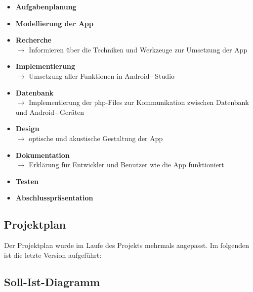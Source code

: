 \documentclass[12pt, a4paper]{article}
\begin{document}
\begin{itemize}

\item \textbf{Aufgabenplanung}   

\item \textbf{Modellierung der App} 

\item \textbf{Recherche} \\
$\rightarrow$ Informieren über die Techniken und Werkzeuge zur Umsetzung der App

\item \textbf{Implementierung} \\
$\rightarrow$ Umsetzung aller Funktionen in Android$-$Studio

\item \textbf{Datenbank} \\
$\rightarrow$ Implementierung der php-Files zur Kommunikation zwischen Datenbank und Android$-$Geräten

\item \textbf{Design} \\
$\rightarrow$ optische und akustische Gestaltung der App

\item \textbf{Dokumentation} \\
$\rightarrow$ Erklärung für Entwickler und Benutzer wie die App funktioniert

\item \textbf{Testen} 

\item \textbf{Abschlusspräsentation} 

\end{itemize}
		

	\subsection{Projektplan}

Der Projektplan wurde im Laufe des Projekts mehrmals angepasst. Im folgenden ist die letzte Version aufgeführt: 




	\subsection{Soll-Ist-Diagramm} 
\end{document}
